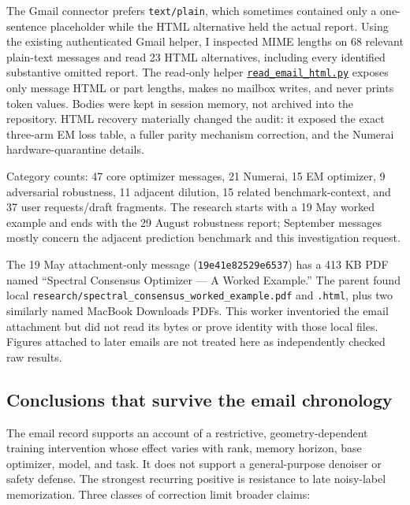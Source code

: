 \documentclass[
  british,
  10pt,
  a4paper,
]{article}
\begin{document}
The Gmail connector prefers \texttt{text/plain}, which sometimes
contained only a one-\allowbreak{}sentence placeholder while the HTML
alternative held the actual report. Using the existing authenticated
Gmail helper, I inspected MIME lengths on 68 relevant plain-text
messages and read 23 HTML alternatives\allowbreak{},\allowbreak{}
including every identified substantive omitted report. The read-only
helper
\href{../sources/read_email_html.py}{\texttt{read\_\allowbreak{}email\_\allowbreak{}html.\allowbreak{}py}}
exposes only message HTML or part lengths, makes no mailbox writes, and
never prints token values. Bodies were kept in session memory, not
archived into the repository.\allowbreak{} HTML recovery materially
changed the audit: it exposed the exact three-arm EM loss table, a
fuller parity mechanism correction,\allowbreak{} and the Numerai
hardware-\allowbreak{}quarantine details.

Category counts: 47 core optimizer messages, 21 Numerai, 15 EM
optimizer, 9 adversarial robustness,\allowbreak{} 11 adjacent dilution,
15 related benchmark-\allowbreak{}context,\allowbreak{} and 37 user
requests/\allowbreak{}draft fragments. The research starts with a 19 May
worked example and ends with the 29 August robustness report; September
messages mostly concern the adjacent prediction benchmark and this
investigation request.

The 19 May attachment-\allowbreak{}only message
(\texttt{19e41e82529e\allowbreak{}6537}) has a 413 KB PDF named
``Spectral Consensus Optimizer --- A Worked Example.'' The parent found
local
\texttt{research/\allowbreak{}spectral\_\allowbreak{}consensus\_\allowbreak{}worked\_\allowbreak{}example.\allowbreak{}pdf}
and \texttt{.html}, plus two similarly named MacBook Downloads PDFs.
This worker inventoried the email attachment but did not read its bytes
or prove identity with those local files. Figures attached to later
emails are not treated here as independently checked raw results.

\subsection{Conclusions that survive the email
chronology}\label{email-evidence--conclusions-that-survive-the-email-chronology}

The email record supports an account of a restrictive,\allowbreak{}
geometry-\allowbreak{}dependent training intervention whose effect
varies with rank, memory horizon, base optimizer, model, and task. It
does not support a general-\allowbreak{}purpose denoiser or safety
defense. The strongest recurring positive is resistance to late
noisy-\allowbreak{}label memorization\allowbreak{}.\allowbreak{} Three
classes of correction limit broader claims:
\end{document}
